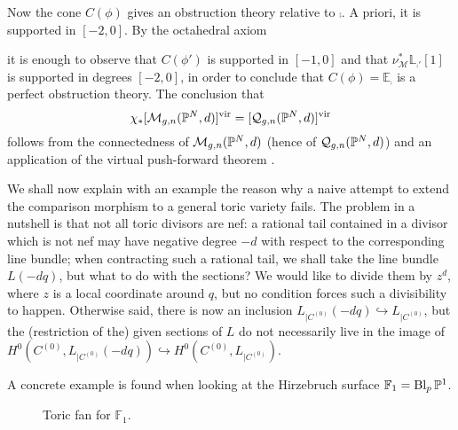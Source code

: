 Now the cone $C(\phi)$ gives an obstruction theory relative to $\comp$. A priori, it is supported in $[-2,0]$. By the octahedral axiom
\begin{center}
\end{center}
it is enough to observe that $C(\phi')$ is supported in $[-1,0]$ \cite[Lemma 4.20]{Manolache-Push} and that $\nu_{\mathcal M}^*\mathbb L_{\comp'}{[1]}$ is supported in degrees $[-2,0]$, in order to conclude that $C(\phi)=\mathbb E_{\comp}$ is a perfect obstruction theory. The conclusion that
\[
 \chi_*[\mathcal{M}_{g,n}(\mathbb P^N,d)]^{\text{vir}}=[\mathcal{Q}_{g,n}(\mathbb P^N,d)]^{\text{vir}}
\]
follows from the connectedness of $\mathcal{M}_{g,n}(\mathbb P^N,d)$ \cite{KP} (hence of $\mathcal{Q}_{g,n}(\mathbb P^N,d)$) and an application of the virtual push-forward theorem \cite[Proposition 4.21]{Manolache-Push}.

We shall now explain with an example the reason why a naive attempt to extend the comparison morphism to a general toric variety fails. The problem in a nutshell is that not all toric divisors are nef: a rational tail contained in a divisor which is not nef may have negative degree $-d$ with respect to the corresponding line bundle; when contracting such a rational tail, we shall take the line bundle $L(-dq)$, but what to do with the sections? We would like to divide them by $z^d$, where $z$ is a local coordinate around $q$, but no condition forces such a divisibility to happen. Otherwise said, there is now an inclusion $L_{|C^{(0)}}(-dq)\hookrightarrow L_{|C^{(0)}}$, but the (restriction of the) given sections of $L$ do not necessarily live in the image of $H^0(C^{(0)},L_{|C^{(0)}}(-dq))\hookrightarrow H^0(C^{(0)},L_{|C^{(0)}})$.

A concrete example is found when looking at the Hirzebruch surface $\mathbb F_1=\operatorname{Bl}_{p}\mathbb P^1$.
\begin{figure}
\caption{Toric fan for $\mathbb F_1$.}
\end{figure}

